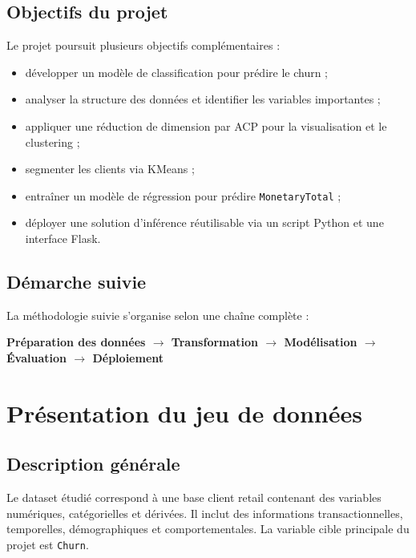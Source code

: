 \documentclass[11pt,a4paper]{article}
\begin{document}
\subsection{Objectifs du projet}
Le projet poursuit plusieurs objectifs complémentaires :
\begin{itemize}
    \item développer un modèle de classification pour prédire le churn ;
    \item analyser la structure des données et identifier les variables importantes ;
    \item appliquer une réduction de dimension par ACP pour la visualisation et le clustering ;
    \item segmenter les clients via KMeans ;
    \item entraîner un modèle de régression pour prédire \texttt{MonetaryTotal} ;
    \item déployer une solution d’inférence réutilisable via un script Python et une interface Flask.
\end{itemize}

\subsection{Démarche suivie}
La méthodologie suivie s’organise selon une chaîne complète :
\begin{center}
\textbf{Préparation des données $\rightarrow$ Transformation $\rightarrow$ Modélisation $\rightarrow$ Évaluation $\rightarrow$ Déploiement}
\end{center}

\section{Présentation du jeu de données}

\subsection{Description générale}
Le dataset étudié correspond à une base client retail contenant des variables numériques, catégorielles et dérivées. Il inclut des informations transactionnelles, temporelles, démographiques et comportementales. La variable cible principale du projet est \texttt{Churn}.
\end{document}

